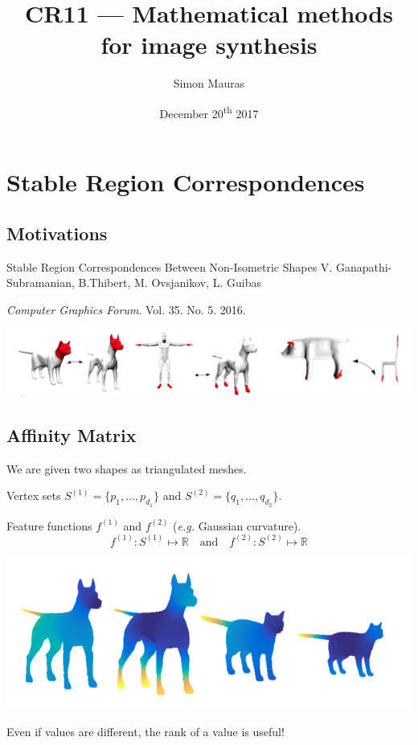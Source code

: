 \documentclass{beamer}
\title{CR11 --- Mathematical methods for image synthesis}
\author{Simon Mauras}
\institute{ENS de Lyon}
\date{December 20\textsuperscript{th} 2017}
\begin{document}
\begin{frame}
  \titlepage
\end{frame}

\begin{frame}
  \tableofcontents
\end{frame}

\section{Stable Region Correspondences}

\subsection{Motivations}

\begin{frame}
  \begin{block}{Stable Region Correspondences Between Non-Isometric Shapes}
    V. Ganapathi-Subramanian, B.Thibert, M. Ovsjanikov, L. Guibas
    
    \medskip\textit{Computer Graphics Forum}. Vol. 35. No. 5. 2016.
  \end{block}
  
  \bigskip\includegraphics[width=\textwidth]{article/intro.png}
\end{frame}

\subsection{Affinity Matrix}

\begin{frame}
  We are given two shapes as triangulated meshes.
  
  \medskip Vertex sets $S^{(1)} = \{p_1, \dots, p_{d_1}\}$ and $S^{(2)} = \{q_1, \dots, q_{d_2}\}$.
  
  \medskip Feature functions $f^{(1)}$ and $f^{(2)}$ (\textit{e.g.} Gaussian curvature).
  \[f^{(1)} : S^{(1)} \mapsto \mathbb R \quad\text{and}\quad f^{(2)} : S^{(2)} \mapsto \mathbb R\]
  
  \includegraphics[width=\textwidth]{article/features.png}
  
  Even if values are different, the rank of a value is useful!
\end{frame}
\end{document}
